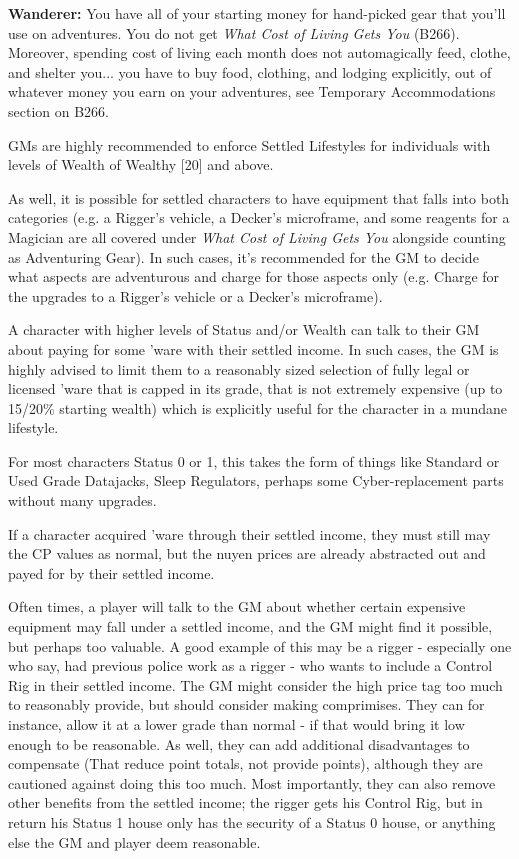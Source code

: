 \begin{multicols}{2}
	\textbf{Wanderer:} You have all of your starting money for hand-picked gear that you'll use on adventures. You do not get \textit{What Cost of Living Gets You} (B266). Moreover, spending cost of living each month does not automagically feed, clothe, and shelter you... you have to buy food, clothing, and lodging explicitly, out of whatever money you earn on your adventures, see Temporary Accommodations section on B266.
	
	GMs are highly recommended to enforce Settled Lifestyles for individuals with levels of Wealth of Wealthy [20] and above. 
	
	As well, it is possible for settled characters to have equipment that falls into both categories (e.g. a Rigger's vehicle, a Decker's microframe, and some reagents for a Magician are all covered under \textit{What Cost of Living Gets You} alongside counting as Adventuring Gear). In such cases, it's recommended for the GM to decide what aspects are adventurous and charge for those aspects only (e.g. Charge for the upgrades to a Rigger's vehicle or a Decker's microframe).
	
	A character with higher levels of Status and/or Wealth can talk to their GM about paying for some 'ware with their settled income. In such cases, the GM is highly advised to limit them to a reasonably sized selection of fully legal or licensed 'ware that is capped in its grade, that is not extremely expensive (up to 15/20\% starting wealth) which is explicitly useful for the character in a mundane lifestyle. 
	
	For most characters Status 0 or 1, this takes the form of things like Standard or Used Grade Datajacks, Sleep Regulators, perhaps some Cyber-replacement parts without many upgrades.
	
	If a character acquired 'ware through their settled income, they must still may the CP values as normal, but the nuyen prices are already abstracted out and payed for by their settled income.
	
	Often times, a player will talk to the GM about whether certain expensive equipment may fall under a settled income, and the GM might find it possible, but perhaps too valuable. A good example of this may be a rigger - especially one who say, had previous police work as a rigger - who wants to include a Control Rig in their settled income. The GM might consider the high price tag too much to reasonably provide, but should consider making comprimises. They can for instance, allow it at a lower grade than normal - if that would bring it low enough to be reasonable. As well, they can add additional disadvantages to compensate (That reduce point totals, not provide points), although they are cautioned against doing this too much. Most importantly, they can also remove other benefits from the settled income; the rigger gets his Control Rig, but in return his Status 1 house only has the security of a Status 0 house, or anything else the GM and player deem reasonable.
	

\end{multicols}
